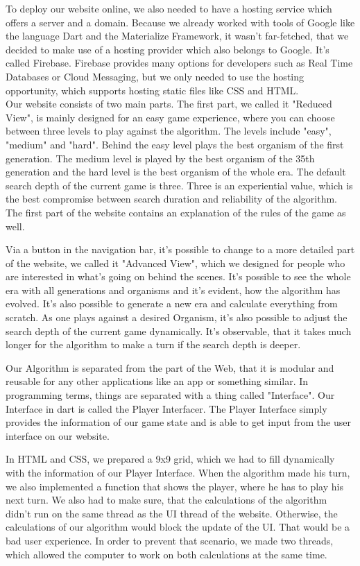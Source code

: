 To deploy our website online, we also needed to have a hosting service which offers a server and a domain. Because we already worked with tools of Google like the language Dart and the Materialize Framework, it wasn't far-fetched, that we decided to make use of a hosting provider which also belongs to Google. It's called Firebase. Firebase provides many options for developers such as Real Time Databases or Cloud Messaging, but we only needed to use the hosting opportunity, which supports hosting static files like CSS and HTML.\\

Our website consists of two main parts. The first part, we called it "Reduced View", is mainly designed for an easy game experience, where you can choose between three levels to play against the algorithm. The levels include "easy", "medium" and "hard". Behind the easy level plays the best organism of the first generation. 
The medium level is played by the best organism of the 35th %
generation and the hard level is the best organism of the whole era. The default search depth of the current game is three. Three is an experiential value, which is the best compromise between search duration and reliability of the algorithm.
The first part of the website contains an explanation of the rules of the game as well.

Via a button in the navigation bar, it's possible to change to a more detailed  part of the website, we called it "Advanced View", which we designed for people who are interested in what's going on behind the scenes. It's possible to see the whole era with all generations and organisms and it's evident, how the algorithm has evolved. It's also possible to generate a new era and calculate everything from scratch. As one plays against a desired Organism, it's also possible to adjust the search depth of the current game dynamically. It's observable, that it takes much longer for the algorithm to make a turn if the search depth is deeper. %

Our Algorithm is separated from the part of the Web, that it is modular and reusable for any other applications like an app or something similar. In programming terms, things are separated with a thing called "Interface". Our Interface in dart is called the Player Interfacer. The Player Interface simply provides the information of our game state and is able to get input from the user interface on our website.

In HTML and CSS, we prepared a 9x9 grid, which we had to fill dynamically with the information of our Player Interface. When the algorithm made his turn, we also implemented a function that shows the player, where he has to play his next turn. 
We also had to make sure, that the calculations of the algorithm didn't run on the same thread as the UI thread of the website. Otherwise, the calculations of our algorithm would block the update of the UI. That would be a bad user experience. In order to prevent that scenario, we made two threads, which allowed the computer to work on both calculations at the same time. 


